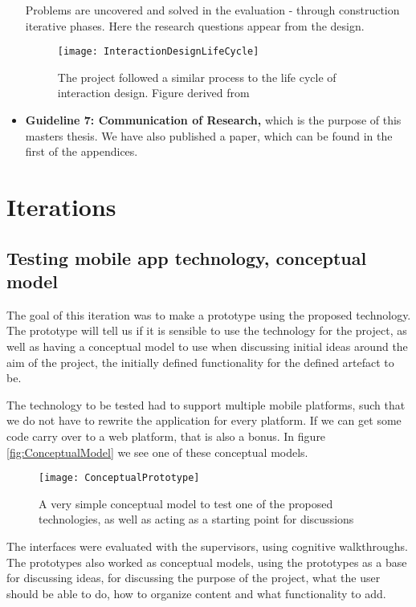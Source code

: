 \begin{itemize}
	Problems are uncovered and solved in the evaluation - through construction iterative phases. Here the research questions appear from the design. 
	
		\begin{figure}[h!]
		\texttt{[image: InteractionDesignLifeCycle]}
		\caption {The project followed a similar process to the life cycle of interaction design. Figure derived from \textcite{Preece2015}}
		\label{fig:InteractionDesignLifeCycle}
	\end{figure}
	\item \textbf{Guideline 7: Communication of Research,} which is the purpose of this masters thesis. We have also published a paper, which can be found in the first of the appendices.
\end{itemize}


\section{Iterations}


\subsection {Testing mobile app technology, conceptual model}
The goal of this iteration was to make a prototype using the proposed technology. The prototype will tell us if it is sensible to use the technology for the project, as well as having a conceptual model to use when discussing initial ideas around the aim of the project, the initially defined functionality for the defined artefact to be.

The technology to be tested had to support multiple mobile platforms, such that we do not have to rewrite the application for every platform. If we can get some code carry over to a web platform, that is also a bonus. In figure \ref{fig:ConceptualModel} we see one of these conceptual models.


\begin{figure}[h!]
	\texttt{[image: ConceptualPrototype]}
	\caption {A very simple conceptual model to test one of the proposed technologies, as well as acting as a starting point for discussions}
	\label{fig:ConseptualModel}
\end{figure}

The interfaces were evaluated with the supervisors, using cognitive walkthroughs. The prototypes also worked as conceptual models, using the prototypes as a base for discussing ideas, for discussing the purpose of the project, what the user should be able to do, how to organize content and what functionality to add.

